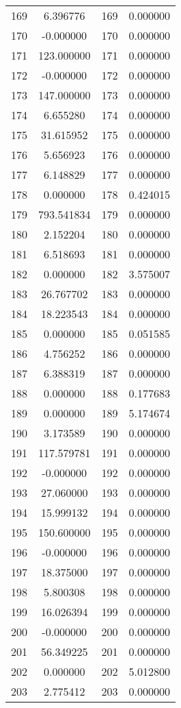\documentclass[12pt]{article}
\begin{document}
\begin{longtable}{@{}cccc@{}}
169 & 6.396776 & 169 & 0.000000 \\
170 & -0.000000 & 170 & 0.000000 \\
171 & 123.000000 & 171 & 0.000000 \\
172 & -0.000000 & 172 & 0.000000 \\
173 & 147.000000 & 173 & 0.000000 \\
174 & 6.655280 & 174 & 0.000000 \\
175 & 31.615952 & 175 & 0.000000 \\
176 & 5.656923 & 176 & 0.000000 \\
177 & 6.148829 & 177 & 0.000000 \\
178 & 0.000000 & 178 & 0.424015 \\
179 & 793.541834 & 179 & 0.000000 \\
180 & 2.152204 & 180 & 0.000000 \\
181 & 6.518693 & 181 & 0.000000 \\
182 & 0.000000 & 182 & 3.575007 \\
183 & 26.767702 & 183 & 0.000000 \\
184 & 18.223543 & 184 & 0.000000 \\
185 & 0.000000 & 185 & 0.051585 \\
186 & 4.756252 & 186 & 0.000000 \\
187 & 6.388319 & 187 & 0.000000 \\
188 & 0.000000 & 188 & 0.177683 \\
189 & 0.000000 & 189 & 5.174674 \\
190 & 3.173589 & 190 & 0.000000 \\
191 & 117.579781 & 191 & 0.000000 \\
192 & -0.000000 & 192 & 0.000000 \\
193 & 27.060000 & 193 & 0.000000 \\
194 & 15.999132 & 194 & 0.000000 \\
195 & 150.600000 & 195 & 0.000000 \\
196 & -0.000000 & 196 & 0.000000 \\
197 & 18.375000 & 197 & 0.000000 \\
198 & 5.800308 & 198 & 0.000000 \\
199 & 16.026394 & 199 & 0.000000 \\
200 & -0.000000 & 200 & 0.000000 \\
201 & 56.349225 & 201 & 0.000000 \\
202 & 0.000000 & 202 & 5.012800 \\
203 & 2.775412 & 203 & 0.000000 \\

\end{longtable}
\end{document}
